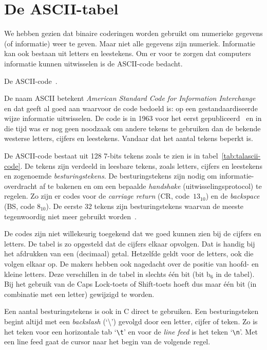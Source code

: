 \chapter{De ASCII-tabel}
\label{cha:asciitabel}
\thispagestyle{empty}

We hebben gezien dat binaire coderingen worden gebruikt om
numerieke gegevens (of informatie) weer te geven. Maar niet alle gegevens zijn numeriek.
Informatie kan ook bestaan uit letters en leestekens. Om er voor te zorgen dat
computers informatie kunnen uitwisselen is de ASCII-code bedacht.

\begin{table}[!p]
\caption{De ASCII-code~\cite{eijkhout2010ascii}.}
\label{tab:talascii-code}
\vspace*{0.7cm}
%
\resizebox{\textwidth}{!}{}

\end{table}

De naam ASCII betekent \textsl{American Standard Code for Information Interchange} en
dat geeft al goed aan waarvoor de code bedoeld is: op een gestandaardiseerde wijze
informatie uitwisselen. De code is in 1963 voor het eerst gepubliceerd~\cite{asa1963ascii}
en in die tijd
was er nog geen noodzaak om andere tekens te gebruiken dan de bekende westerse letters,
cijfers en leestekens. Vandaar dat het aantal tekens beperkt is.

De ASCII-code bestaat uit 128 7-bits tekens zoals te zien is in
tabel~\ref{tab:talascii-code}. De tekens zijn verdeeld in leesbare tekens, zoals letters,
cijfers en leestekens en zogenoemde \textsl{besturingstekens}. De besturingstekens zijn nodig
om informatie-overdracht af te bakenen en om een bepaalde \textsl{handshake} 
(uitwisselingsprotocol) te regelen.
Zo zijn er codes voor de \textsl{carriage return} (CR, code~$13_{10}$) en de
\textsl{backspace} (BS, code $8_{10}$). De eerste 32 tekens zijn besturingstekens
waarvan de meeste tegenwoordig niet meer gebruikt worden~\cite{maini2007digital}.

De codes zijn niet willekeurig toegekend dat we goed kunnen zien bij de cijfers
en letters. De tabel is zo opgesteld dat de cijfers elkaar opvolgen. Dat is
handig bij het afdrukken van een (decimaal) getal.
Hetzelfde geldt voor de letters, ook die volgen elkaar op. De makers hebben ook nagedacht
over de positie van hoofd- en kleine letters. Deze verschillen in de tabel in slechts
\'{e}\'{e}n bit (bit b$_{6}$ in de tabel). Bij het gebruik van de Caps Lock-toets
of Shift-toets hoeft dus maar \'{e}\'{e}n bit (in combinatie met een letter) gewijzigd
te worden.

Een aantal besturingstekens is ook in C direct te gebruiken.
Een besturingsteken begint altijd met een \textsl{backslash} (`\textbackslash')
gevolgd door een letter, cijfer of teken. Zo is het teken voor een horizontale tab
`\texttt{\textbackslash t}' en voor de \textsl{line feed} is het teken
`\texttt{\textbackslash n}'. Met een line feed gaat de cursor naar het begin van de
volgende regel.

